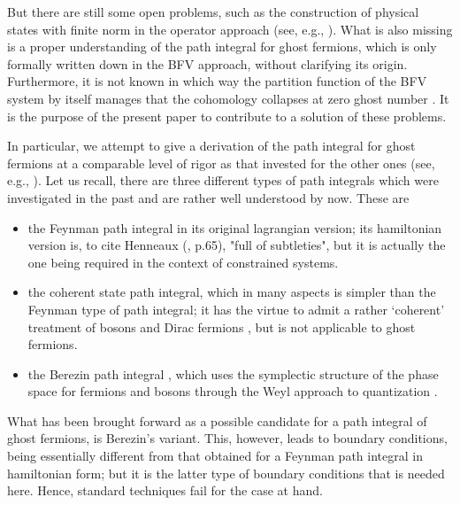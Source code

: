 \documentclass[a4paper,10pt]{article}
\begin{document}
But there are still some open problems, such as the construction of physical states with 
finite norm in the operator approach (see, e.g., \cite{Marn 91,Bata 95}). What is also 
missing is a proper understanding of the path integral for ghost fermions, which is only 
formally written down in the BFV approach, without clarifying its origin. Furthermore, it 
is not known in which way the partition function of the BFV system by itself manages  
that the cohomology collapses at zero ghost number \cite{Roge 97}. It is the purpose of 
the present paper to contribute to a solution of these problems.

In particular, we attempt to give a derivation of the path integral for ghost fermions at 
a comparable level of rigor as that invested for the other ones (see, e.g., \cite{Schu 
81}). Let us recall, there are three different types of path integrals which  were 
investigated in the past and are rather well understood by now. These are
\begin{itemize}
\item the Feynman path integral in its original lagrangian version; its hamiltonian 
version \cite{Tobo 56,Davi 63,Garr 66} is, to cite Henneaux (\cite{Henn 85}, p.65), "full 
of subtleties", but it is actually the one being required in the context of constrained 
systems.
\item the coherent state path integral, which in many aspects is simpler than the Feynman 
type of path integral; it has the virtue to admit a rather `coherent' treatment of bosons 
and Dirac fermions \cite{Bere 66,Fadd 76}, but is not applicable to ghost fermions.
\item the Berezin path integral \cite{Bere 71}, which uses the symplectic structure of 
the phase space for fermions and bosons through the Weyl approach to quantization 
\cite{Bere 77,Mari 80}.
\end{itemize}
What has been brought forward \cite{Henn 92} as a possible candidate for a path integral 
of ghost fermions, is Berezin's variant. This, however, leads to boundary conditions, 
being essentially different from that obtained for a Feynman path integral in hamiltonian 
form; but it is the latter type of boundary conditions that is needed here. Hence, 
standard techniques fail for the case at hand. 
\end{document}
